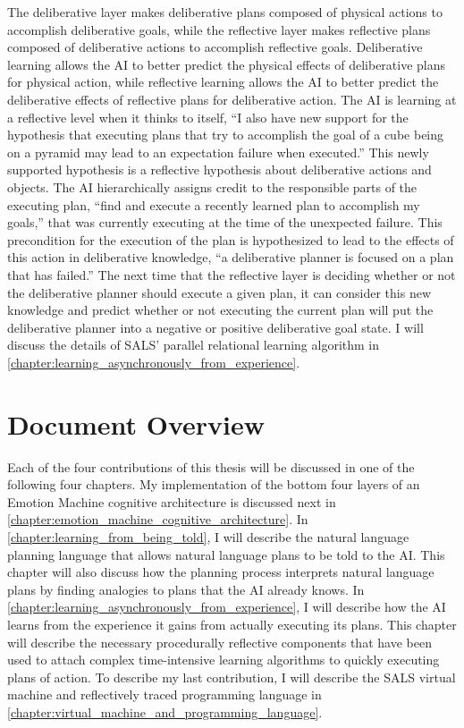 The deliberative layer makes deliberative plans composed of physical
actions to accomplish deliberative goals, while the reflective layer
makes reflective plans composed of deliberative actions to accomplish
reflective goals.  Deliberative learning allows the AI to better
predict the physical effects of deliberative plans for physical
action, while reflective learning allows the AI to better predict the
deliberative effects of reflective plans for deliberative action.  The
AI is learning at a reflective level when it thinks to itself, ``I
also have new support for the hypothesis that executing plans that try
to accomplish the goal of a cube being on a pyramid may lead to an
expectation failure when executed.''  This newly supported hypothesis
is a reflective hypothesis about deliberative actions and objects.
The AI hierarchically assigns credit to the responsible parts of the
executing plan, ``find and execute a recently learned plan to
accomplish my goals,'' that was currently executing at the time of the
unexpected failure.  This precondition for the execution of the plan
is hypothesized to lead to the effects of this action in deliberative
knowledge, ``a deliberative planner is focused on a plan that has
failed.''  The next time that the reflective layer is deciding whether
or not the deliberative planner should execute a given plan, it can
consider this new knowledge and predict whether or not executing the
current plan will put the deliberative planner into a negative or
positive deliberative goal state.  I will discuss the details of SALS'
parallel relational learning algorithm in
{\mbox{\autoref{chapter:learning_asynchronously_from_experience}}}.

\section{Document Overview}

Each of the four contributions of this thesis will be discussed in one
of the following four chapters.  My implementation of the bottom four
layers of an Emotion Machine cognitive architecture is discussed next
in {\mbox{\autoref{chapter:emotion_machine_cognitive_architecture}}}.
In {\mbox{\autoref{chapter:learning_from_being_told}}}, I will
describe the natural language planning language that allows natural
language plans to be told to the AI.  This chapter will also discuss
how the planning process interprets natural language plans by finding
analogies to plans that the AI already knows.  In
{\mbox{\autoref{chapter:learning_asynchronously_from_experience}}}, I
will describe how the AI learns from the experience it gains from
actually executing its plans.  This chapter will describe the
necessary procedurally reflective components that have been used to
attach complex time-intensive learning algorithms to quickly executing
plans of action.  To describe my last contribution, I will describe
the SALS virtual machine and reflectively traced programming language
in
{\mbox{\autoref{chapter:virtual_machine_and_programming_language}}}.

